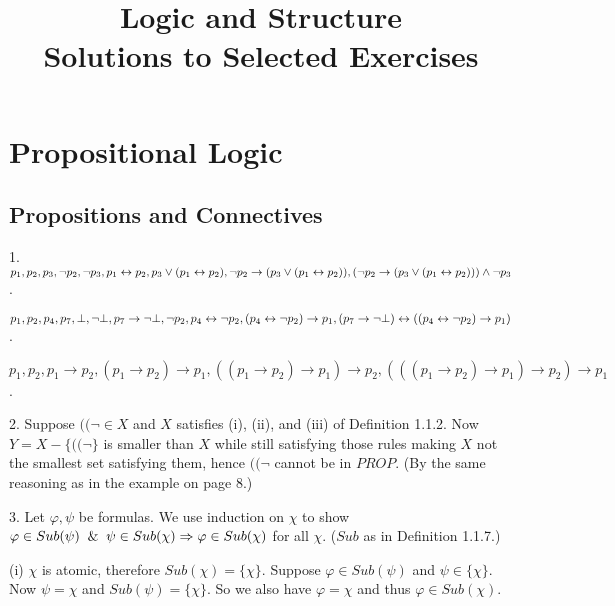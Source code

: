 \documentclass[a4paper,11pt]{article}
\title{Logic and Structure\\
\normalsize{Solutions to Selected Exercises}}
\date{}
\begin{document}
\maketitle


\section{Propositional Logic}


\subsection{Propositions and Connectives}


\begin{description}

\item{1.}
$p_{1}, p_{2}, p_{3}, \neg p_{2}, \neg p_{3}, p_{1} \leftrightarrow p_{2}, p_{3} \vee (p_{1} \leftrightarrow p_{2}),
\neg p_{2} \rightarrow (p_{3} \vee (p_{1} \leftrightarrow p_{2})),\\
(\neg p_{2} \rightarrow (p_{3} \vee (p_{1} \leftrightarrow p_{2}))) \wedge \neg p_{3}$.

$p_{1}, p_{2}, p_{4}, p_{7}, \bot, \neg \bot, p_{7} \rightarrow \neg \bot, \neg p_{2}, p_{4} \leftrightarrow \neg p_{2},
(p_{4} \leftrightarrow \neg p_{2}) \rightarrow p_{1},\\
(p_{7} \rightarrow \neg \bot) \leftrightarrow ((p_{4} \leftrightarrow \neg p_{2}) \rightarrow p_{1})$.

$p_{1}, p_{2}, p_{1} \rightarrow p_{2}, (p_{1} \rightarrow p_{2}) \rightarrow p_{1},
((p_{1} \rightarrow p_{2}) \rightarrow p_{1}) \rightarrow p_{2},
(((p_{1} \rightarrow p_{2}) \rightarrow p_{1}) \rightarrow p_{2}) \rightarrow p_{1}$.

\item{2.}
Suppose $((\neg \in X$ and $X$ satisfies (i), (ii), and (iii) of Definition
1.1.2. Now $Y = X - \{((\neg\}$ is smaller than $X$ while still satisfying
those rules making $X$ not the smallest set satisfying them, hence $((\neg$
cannot be in $PROP$. (By the same reasoning as in the example on page 8.)

\item{3.}
Let $\varphi, \psi$ be formulas. We use induction on $\chi$ to show
$\varphi \in Sub(\psi) \And \psi \in Sub(\chi) \Rightarrow \varphi \in Sub(\chi)$
for all $\chi$.
($Sub$ as in Definition 1.1.7.)
\begin{description}
\item{(i)} $\chi$ is atomic, therefore $Sub(\chi) = \{\chi\}$. Suppose
$\varphi \in Sub(\psi)$ and $\psi \in \{\chi\}$. Now $\psi = \chi$ and
$Sub(\psi) = \{\chi\}$. So we also have $\varphi = \chi$ and thus
$\varphi \in Sub(\chi)$.


\end{description}
\end{description}
\end{document}
